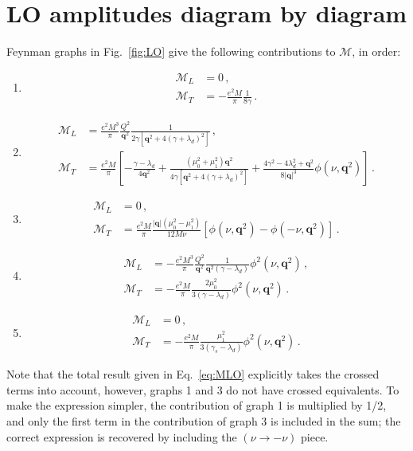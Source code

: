 \documentclass[prl,
twocolumn,
showpacs,preprintnumbers,amsmath,amssymb,
superscriptaddress,
a4paper,nofootinbib,longbibliography]{revtex4-2}
\def\bv#1{\boldsymbol{#1}}
\begin{document}
\section{LO amplitudes diagram by diagram}
Feynman graphs in Fig.~\ref{fig:LO} give the following contributions to $\mathcal{M}$, in order:
\begin{enumerate}
\item 
\begin{align}
    \mathcal{M}_L & = 0\,,\\
    \mathcal{M}_T & = -\frac{e^2 M}{\pi}\frac{1}{8\gamma}\,.
\end{align}
\item
\begin{align}
    \mathcal{M}_L & = \frac{e^2 M^3}{\pi}\frac{Q^2}{\bv{q}^2}\frac{1}{2 \gamma  \left[\bv{q}^2+4 (\gamma +\lambda_d)^2\right]}\,,\\
    \mathcal{M}_T & = \frac{e^2 M}{\pi}\left[-
    \frac{\gamma-\lambda_d}{4 \bv{q}^2}
    +\frac{(\mu_0^2+\mu_1^2) \bv{q}^2}{4 \gamma  \left[\bv{q}^2+4 (\gamma +\lambda_d)^2\right]}+\frac{4 \gamma ^2-4 \lambda_d^2+\bv{q}^2}{8 |\bv{q}|^3}\phi(\nu,\bv{q}^2)
   \right]
   \,.
\end{align}
\item
\begin{align}
    \mathcal{M}_L & = 0\,,\\
    \mathcal{M}_T & = \frac{e^2 M}{\pi}\frac{|\bv{q}| (\mu_0^2-\mu_1^2)}{12 M \nu}
    \left[
    \phi(\nu,\bv{q}^2) - \phi(-\nu,\bv{q}^2) 
   \right]\,.
\end{align}
\item
\begin{align}
    \mathcal{M}_L & = -\frac{e^2 M^3}{\pi}\frac{Q^2}{\bv{q}^2}\frac{1}{\bv{q}^2 (\gamma-\lambda_d)}\phi^2(\nu,\bv{q}^2)\,,\\
    \mathcal{M}_T & = -\frac{e^2 M}{\pi}\frac{2\mu_0^2}{3 (\gamma-\lambda_d)}\phi^2(\nu,\bv{q}^2)\,.
\end{align}
\item
\begin{align}
    \mathcal{M}_L & = 0\,,\\
    \mathcal{M}_T & = -\frac{e^2 M}{\pi}\frac{\mu_1^2}{3 (\gamma_s-\lambda_d)}\phi^2(\nu,\bv{q}^2)\,.
\end{align}
\end{enumerate}
Note that the total result given in Eq.~\eqref{eq:MLO} explicitly takes the crossed terms into account, however, graphs 1 and 3 do not have crossed equivalents. To make the expression simpler, the contribution of graph 1 is multiplied by 1/2, and only the first term in the contribution of graph 3 is included in the sum; the correct expression is recovered by including the $(\nu\to-\nu)$ piece.
\end{document}
